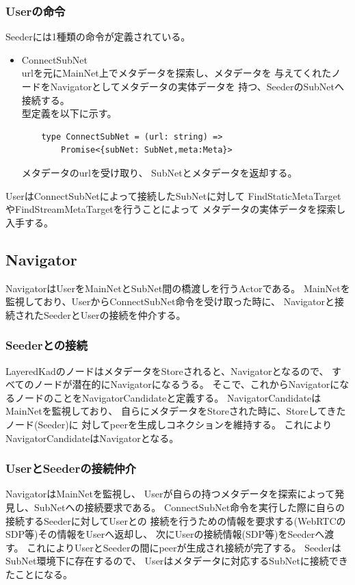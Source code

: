 \documentclass[sotsuron]{jcsie}
\begin{document}
\subsubsection{Userの命令}
Seederには1種類の命令が定義されている。
\begin{itemize}
	\item {ConnectSubNet}\\
	      urlを元にMainNet上でメタデータを探索し、メタデータを
	      与えてくれたノードをNavigatorとしてメタデータの実体データを
	      持つ、SeederのSubNetへ接続する。\\
	      	      
	      型定義を以下に示す。
	      \begin{lstlisting}
	type ConnectSubNet = (url: string) =>
		Promise<{subNet: SubNet,meta:Meta}>
	      \end{lstlisting}
	      	      
	      メタデータのurlを受け取り、
	      SubNetとメタデータを返却する。		
\end{itemize}

UserはConnectSubNetによって接続したSubNetに対して
FindStaticMetaTargetやFindStreamMetaTargetを行うことによって
メタデータの実体データを探索し入手する。

\subsection{Navigator}
NavigatorはUserをMainNetとSubNet間の橋渡しを行うActorである。
MainNetを監視しており、UserからConnectSubNet命令を受け取った時に、
Navigatorと接続されたSeederとUserの接続を仲介する。

\subsubsection{Seederとの接続}
LayeredKadのノードはメタデータをStoreされると、Navigatorとなるので、
すべてのノードが潜在的にNavigatorになるうる。
そこで、これからNavigatorになるノードのことをNavigatorCandidateと定義する。
NavigatorCandidateはMainNetを監視しており、
自らにメタデータをStoreされた時に、Storeしてきたノード(Seeder)に
対してpeerを生成しコネクションを維持する。
これによりNavigatorCandidateはNavigatorとなる。

\subsubsection{UserとSeederの接続仲介}
NavigatorはMainNetを監視し、
Userが自らの持つメタデータを探索によって発見し、SubNetへの接続要求である。
ConnectSubNet命令を実行した際に自らの接続するSeederに対してUserとの
接続を行うための情報を要求する(WebRTCのSDP等)その情報をUserへ返却し、
次にUserの接続情報(SDP等)をSeederへ渡す。
これによりUserとSeederの間にpeerが生成され接続が完了する。
SeederはSubNet環境下に存在するので、
Userはメタデータに対応するSubNetに接続できたことになる。
\end{document}
